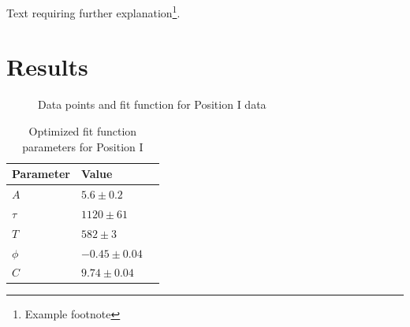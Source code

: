 \documentclass[twoside,twocolumn]{article}
\begin{document}
Text requiring further explanation\footnote{Example footnote}.


\section{Results}


\begin{figure}[H]
\centering
  \begin{center}
  \end{center}
  \caption{Data points and fit function for Position I data}
\end{figure}
\label{fig:pos1_plot}

\begin{table}[H]
\caption{Optimized fit function parameters for Position I}
\centering
\begin{tabular}{llr}
\toprule
\cmidrule(r){1-2}
Parameter & Value \\
\midrule
$ A$ & $ 5.6 \pm 0.2 $ \\
$ \tau$ & $ 1120 \pm 61 $ \\
$ T$ & $ 582 \pm 3 $ \\
$ \phi$ & $ -0.45 \pm 0.04 $ \\
$ C$ & $ 9.74 \pm 0.04 $ \\
\bottomrule
\end{tabular}
\end{table}
\end{document}
